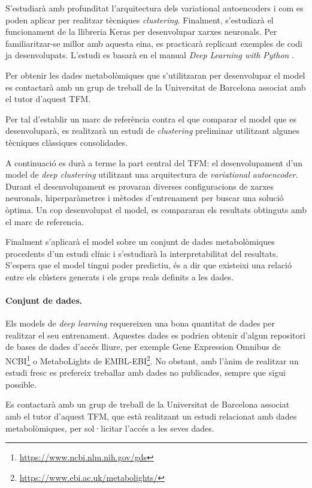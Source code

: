 \documentclass[CAT,BIB]{TFUOC}%
\begin{document}
    S'estudiarà amb profunditat l'arquitectura dels variational autoencoders i com es poden aplicar per realitzar tècniques \textit{clustering}. Finalment, s'estudiarà el funcionament de la llibreria Keras per desenvolupar xarxes neuronals. Per familiaritzar-se millor amb aquesta eina, es practicarà replicant exemples de codi ja desenvolupats. L'estudi es basarà en el manual \textit{Deep Learning with Python} \citep{Ketkar2021}.

    Per obtenir les dades metabolòmiques que s'utilitzaran per desenvolupar el model es contactarà amb un grup de treball de la Universitat de Barcelona associat amb el tutor d'aquest TFM.

    Per tal d'establir un marc de referència contra el que comparar el model que es desenvoluparà, es realitzarà un estudi de \textit{clustering} preliminar utilitzant algunes tècniques clàssiques consolidades.

    A continuació es durà a terme la part central del TFM: el desenvolupament d'un model de \textit{deep clustering} utilitzant una arquitectura de \textit{variational autoencoder}. Durant el desenvolupament es provaran diverses configuracions de xarxes neuronals, hiperparàmetres i mètodes d'entrenament per buscar una solució òptima. Un cop desenvolupat el model, es compararan els resultats obtinguts amb el marc de referencia.

    Finalment s'aplicarà el model sobre un conjunt de dades metabolòmiques procedents d'un estudi clínic i s'estudiarà la interpretabilitat del resultats. S'espera que el model tingui poder predictiu, és a dir que existeixi una relació entre els clústers generats i els grups reals definits a les dades.

    \paragraph{Conjunt de dades.}

        Els models de \textit{deep learning} requereixen una bona quantitat de dades per realitzar el seu entrenament. Aquestes dades es podrien obtenir d'algun repositori de bases de dades d'accés lliure, per exemple Gene Expression Omnibus de NCBI\footnote{\url{https://www.ncbi.nlm.nih.gov/gds}} o MetaboLights de EMBL-EBI\footnote{\url{https://www.ebi.ac.uk/metabolights/}}. No obstant, amb l'ànim de realitzar un estudi fresc es prefereix treballar amb dades no publicades, sempre que sigui possible.

        Es contactarà amb un grup de treball de la Universitat de Barcelona associat amb el tutor d'aquest TFM, que està realitzant un estudi relacionat amb dades metabolòmiques, per sol·licitar l'accés a les seves dades.
\end{document}

